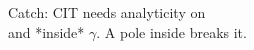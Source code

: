 \documentclass[preview]{standalone}
\begin{document}
\begin{center}
Catch: CIT needs analyticity on \\ and *inside* $\gamma$. A pole inside breaks it.
\end{center}
\end{document}
